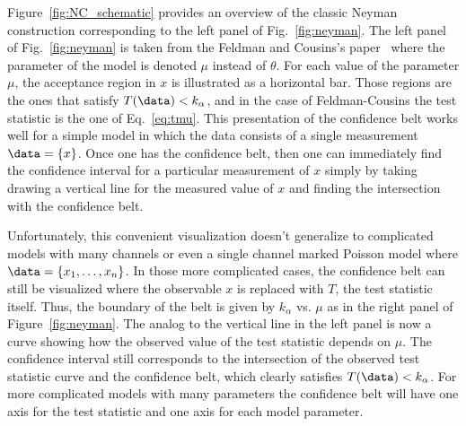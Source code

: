 Figure~\ref{fig:NC_schematic} provides an overview of the classic Neyman construction corresponding to the left panel of Fig.~\ref{fig:neyman}.  The left panel of  Fig.~\ref{fig:neyman} is taken from the Feldman and Cousins's paper~\cite{Feldman:1997qc} where the parameter of the model is denoted $\mu$ instead of $\theta$.  For each value of the parameter $\mu$, the acceptance region in $x$ is illustrated as a horizontal bar.  Those regions are the ones that satisfy $T(\data)<k_\alpha$, and in the case of Feldman-Cousins the test statistic is the one of Eq.~\ref{eq:tmu}.  This presentation of the confidence belt works well for a simple model in which the data consists of a single measurement $\data=\{x\}$.  Once one has the confidence belt, then one can immediately find the confidence interval for a particular measurement of $x$ simply by taking drawing a vertical line for the measured value of $x$ and finding the intersection with the confidence belt.


Unfortunately, this convenient visualization doesn't generalize to complicated models with many channels or even a single channel marked Poisson model where $\data=\{x_1,\dots,x_n\}$.  In those more complicated cases, the confidence belt can still be visualized where the observable $x$ is replaced with $T$, the test statistic itself.  Thus, the boundary of the belt is given by $k_\alpha$ vs. $\mu$ as in the right panel of Figure~\ref{fig:neyman}. The analog to the vertical line in the left panel is now a curve showing how the observed value of the test statistic depends on $\mu$.  The confidence interval still corresponds to the intersection of the observed test statistic curve and the confidence belt, which clearly satisfies $T(\data)<k_\alpha$.  For more complicated models with many parameters the confidence belt will have one axis for the test statistic and one axis for each model parameter.
